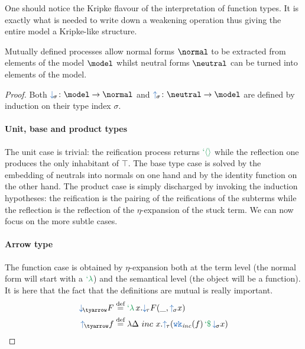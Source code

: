 \documentclass[preprint]{sigplanconf}
\begin{document}
\begin{remark}One should notice the Kripke flavour of the interpretation of
function types. It is exactly what is needed to write down a weakening operation
thus giving the entire model a Kripke-like structure.
\end{remark}
\begin{definition} Mutually defined processes allow normal forms
$\normal$ to be extracted from elements of the model $\model$ whilst neutral
forms $\neutral$ can be turned into elements of the model.
\end{definition}
\begin{proof} Both $\reify \colon \model \rightarrow \normal$ and $\reflect \colon
\neutral \rightarrow \model$ are defined by induction on their type index $\sigma$.
\paragraph{Unit, base and product types} The unit case is trivial: the
reification process returns $\tett$ while the reflection one produces the
only inhabitant of $\top$. The base type case is solved by the embedding of
neutrals into normals on one hand and by the identity function on the other
hand. The product case is simply discharged by invoking the induction
hypotheses: the reification is the pairing of the reifications of the subterms
while the reflection is the reflection of the $\eta$-expansion of the stuck
term. We can now focus on the more subtle cases.

\paragraph{Arrow type} The function case is obtained by $\eta$-expansion both
at the term level (the normal form will start with a $\telam$) and the
semantical level (the object will be a function). It is here that the fact
that the definitions are mutual is really important.
\begin{align*}
\reify[\tyarrow] F &\eqdef \telam x. \reify[\tau] F (\_, \reflect x) \\
\reflect[\tyarrow] f &\eqdef \lambda \Delta~inc~x.\reflect[\tau](\weaken(f) \teapp \reify[\sigma] x)
\end{align*}


\end{proof}
\end{document}
